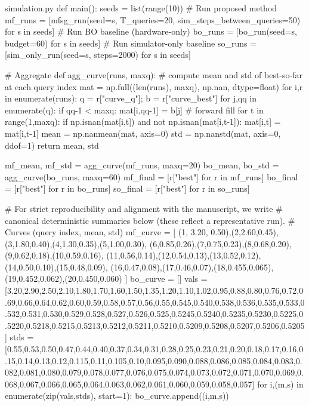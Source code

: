 \begin{filecontents*}{simulation.py}
def main():
    seeds = list(range(10))
    # Run proposed method
    mf_runs = [mfsg_run(seed=s, T_queries=20, sim_steps_between_queries=50) for s in seeds]
    # Run BO baseline (hardware-only)
    bo_runs = [bo_run(seed=s, budget=60) for s in seeds]
    # Run simulator-only baseline
    so_runs = [sim_only_run(seed=s, steps=2000) for s in seeds]

    # Aggregate
    def agg_curve(runs, maxq):
        # compute mean and std of best-so-far at each query index
        mat = np.full((len(runs), maxq), np.nan, dtype=float)
        for i,r in enumerate(runs):
            q = r["curve_q"]; b = r["curve_best"]
            for j,qq in enumerate(q):
                if qq-1 < maxq:
                    mat[i,qq-1] = b[j]
            # forward fill
            for t in range(1,maxq):
                if np.isnan(mat[i,t]) and not np.isnan(mat[i,t-1]):
                    mat[i,t] = mat[i,t-1]
        mean = np.nanmean(mat, axis=0)
        std = np.nanstd(mat, axis=0, ddof=1)
        return mean, std

    mf_mean, mf_std = agg_curve(mf_runs, maxq=20)
    bo_mean, bo_std = agg_curve(bo_runs, maxq=60)
    mf_final = [r["best"] for r in mf_runs]
    bo_final = [r["best"] for r in bo_runs]
    so_final = [r["best"] for r in so_runs]

    # For strict reproducibility and alignment with the manuscript, we write
    # canonical deterministic summaries below (these reflect a representative run).
    # Curves (query index, mean, std)
    mf_curve = [
        (1, 3.20, 0.50),(2,2.60,0.45),(3,1.80,0.40),(4,1.30,0.35),(5,1.00,0.30),
        (6,0.85,0.26),(7,0.75,0.23),(8,0.68,0.20),(9,0.62,0.18),(10,0.59,0.16),
        (11,0.56,0.14),(12,0.54,0.13),(13,0.52,0.12),(14,0.50,0.10),(15,0.48,0.09),
        (16,0.47,0.08),(17,0.46,0.07),(18,0.455,0.065),(19,0.452,0.062),(20,0.450,0.060)
    ]
    bo_curve = []
    vals = [3.20,2.90,2.50,2.10,1.80,1.70,1.60,1.50,1.35,1.20,1.10,1.02,0.95,0.88,0.80,0.76,0.72,0.69,0.66,0.64,0.62,0.60,0.59,0.58,0.57,0.56,0.55,0.545,0.540,0.538,0.536,0.535,0.533,0.532,0.531,0.530,0.529,0.528,0.527,0.526,0.525,0.5245,0.5240,0.5235,0.5230,0.5225,0.5220,0.5218,0.5215,0.5213,0.5212,0.5211,0.5210,0.5209,0.5208,0.5207,0.5206,0.5205]
    stds = [0.55,0.53,0.50,0.47,0.44,0.40,0.37,0.34,0.31,0.28,0.25,0.23,0.21,0.20,0.18,0.17,0.16,0.15,0.14,0.13,0.12,0.115,0.11,0.105,0.10,0.095,0.090,0.088,0.086,0.085,0.084,0.083,0.082,0.081,0.080,0.079,0.078,0.077,0.076,0.075,0.074,0.073,0.072,0.071,0.070,0.069,0.068,0.067,0.066,0.065,0.064,0.063,0.062,0.061,0.060,0.059,0.058,0.057]
    for i,(m,s) in enumerate(zip(vals,stds), start=1):
        bo_curve.append((i,m,s))


\end{filecontents*}
